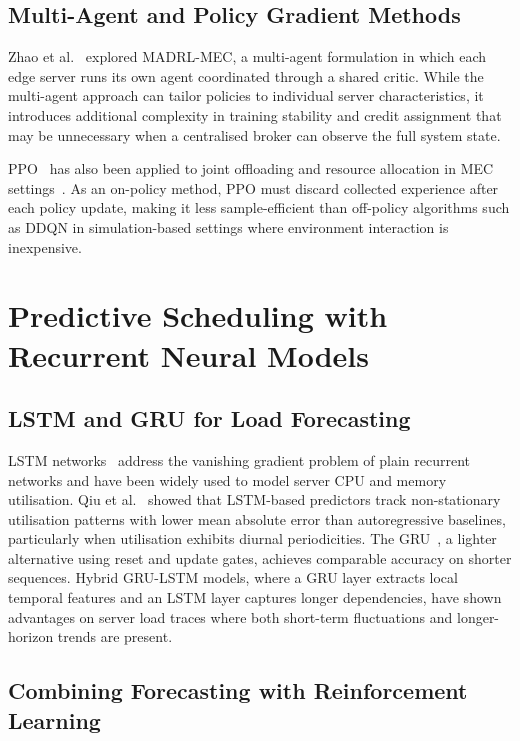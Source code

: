 \subsection{Multi-Agent and Policy Gradient Methods}

Zhao et al.~\cite{zhao2022madrl} explored MADRL-MEC, a multi-agent
formulation in which each edge server runs its own agent
coordinated through a shared critic. While the multi-agent approach
can tailor policies to individual server characteristics, it
introduces additional complexity in training stability and credit
assignment that may be unnecessary when a centralised broker can
observe the full system state.

PPO~\cite{schulman2017ppo} has also been applied to joint
offloading and resource allocation in MEC
settings~\cite{chen2019optimized}. As an on-policy method, PPO
must discard collected experience after each policy update, making
it less sample-efficient than off-policy algorithms such as DDQN
in simulation-based settings where environment interaction is
inexpensive.

\section{Predictive Scheduling with Recurrent Neural Models}
\label{sec:lit_lstm}

\subsection{LSTM and GRU for Load Forecasting}

LSTM networks~\cite{hochreiter1997lstm} address the vanishing
gradient problem of plain recurrent networks and have been widely
used to model server CPU and memory utilisation. Qiu et
al.~\cite{qiu2020lstm} showed that LSTM-based predictors track
non-stationary utilisation patterns with lower mean absolute error
than autoregressive baselines, particularly when utilisation
exhibits diurnal periodicities. The GRU~\cite{cho2014gru}, a
lighter alternative using reset and update gates, achieves
comparable accuracy on shorter sequences. Hybrid GRU-LSTM models,
where a GRU layer extracts local temporal features and an LSTM
layer captures longer dependencies, have shown advantages on
server load traces where both short-term fluctuations and
longer-horizon trends are present.

\subsection{Combining Forecasting with Reinforcement Learning}

